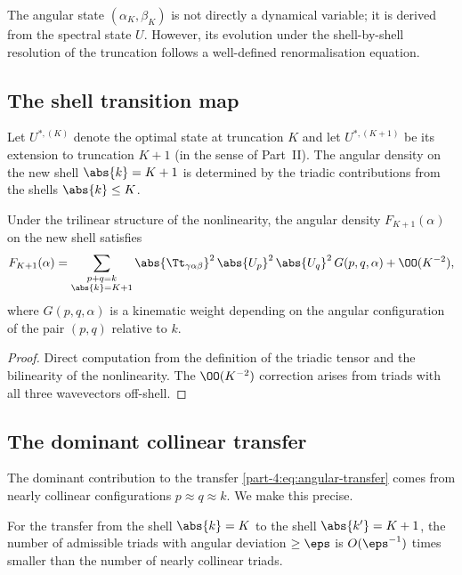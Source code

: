 The angular state $(\alpha_K,\beta_K)$ is not directly a dynamical 
variable; it is derived from the spectral state $U$. However, its 
evolution under the shell-by-shell resolution of the truncation 
follows a well-defined renormalisation equation.

\subsection{The shell transition map}
\label{part-4:ssec:shell-transition}

Let $U^{\ast,(K)}$ denote the optimal state at truncation $K$ and let 
$U^{\ast,(K+1)}$ be its extension to truncation $K+1$ (in the sense 
of Part~II). The angular density on the new shell $\abs{k}=K+1$ is 
determined by the triadic contributions from the shells $\abs{k}\leq 
K$.

\begin{proposition}\label{part-4:prop:angular-transfer}
Under the trilinear structure of the nonlinearity, the angular 
density $F_{K+1}(\alpha)$ on the new shell satisfies
\begin{equation}\label{part-4:eq:angular-transfer}
F_{K+1}(\alpha) = \sum_{\substack{p+q=k\\ \abs{k}=K+1}}
\abs{\Tt_{\gamma\alpha\beta}}^2\,\abs{U_p}^2\,\abs{U_q}^2\,G(p,q,\alpha) + 
\OO(K^{-2}),
\end{equation}
where $G(p,q,\alpha)$ is a kinematic weight depending on the angular 
configuration of the pair $(p,q)$ relative to $k$.
\end{proposition}

\begin{proof}
Direct computation from the definition of the triadic tensor and the 
bilinearity of the nonlinearity. The $\OO(K^{-2})$ correction arises 
from triads with all three wavevectors off-shell.
\end{proof}

\subsection{The dominant collinear transfer}
\label{part-4:ssec:collinear}

The dominant contribution to the transfer \eqref{part-4:eq:angular-transfer} 
comes from nearly collinear configurations $p\approx q\approx k$. We 
make this precise.

\begin{lemma}\label{part-4:lem:collinear}
For the transfer from the shell $\abs{k}=K$ to the shell 
$\abs{k'}=K+1$, the number of admissible triads with angular 
deviation $\geq\eps$ is $O(\eps^{-1})$ times smaller than the number 
of nearly collinear triads.
\end{lemma}

